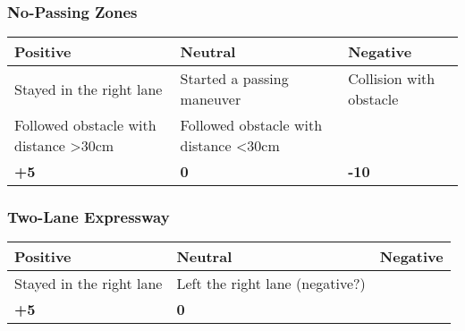 {\subsubsection*{No-Passing Zones}
\begin{table}[H]
    \begin{tabularx}{\textwidth}{@{}XXX@{}}
        \toprule
        \textbf{Positive}                     & \textbf{Neutral}                      & \textbf{Negative}       \\
        \midrule
        Stayed in the right lane              & Started a passing maneuver            & Collision with obstacle \\
        Followed obstacle with distance >30cm & Followed obstacle with distance <30cm &                         \\
        \textbf{+5}                           & \textbf{0}                            & \textbf{-10}            \\
        \bottomrule
    \end{tabularx}
\end{table}

\subsubsection*{Two-Lane Expressway}
\begin{table}[H]
    \begin{tabularx}{\textwidth}{@{}XXX@{}}
        \toprule
        \textbf{Positive}        & \textbf{Neutral}                & \textbf{Negative} \\
        \midrule
        Stayed in the right lane & Left the right lane (negative?) &                   \\
        \textbf{+5}              & \textbf{0}                      &                   \\
        \bottomrule
    \end{tabularx}
\end{table}

}

